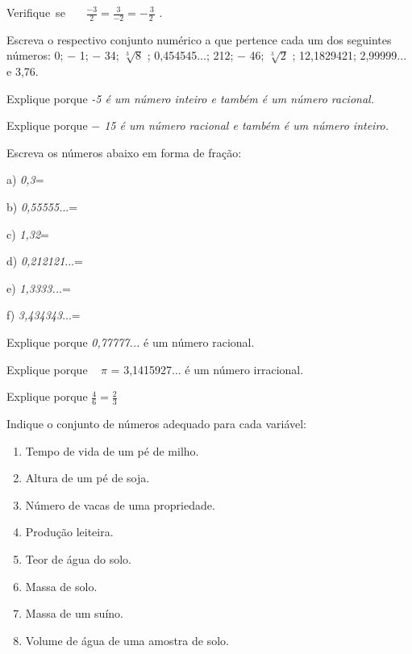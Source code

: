 \begin{exercicios}
\exitem{} Verifique~se~~~   \( \frac{-3}{2}=\frac{3}{-2}=-\frac{3}{2~} \) .

\exitem{} Escreva o respectivo conjunto numérico a que pertence cada um dos seguintes números:  0; $-$ 1; $-$ 34;  \( \sqrt[3]{8} \) ; 0,454545...; 212; $-$ 46;  \( \sqrt[3]{2} \) ; 12,1829421; 2,99999... e 3,76.

\exitem{} Explique porque \textit{-5 é um número inteiro e também é um número racional.}

\exitem{} Explique porque \textit{$-$ 15 é um número racional e também é um número inteiro.}

\exitem{} Escreva os números abaixo em forma de fração:
\begin{multicols}{3}
	
a) \textit{0,3}=

b) \textit{0,55555.}..=

c) \textit{1,32}= 

d) \textit{0,212121}...=

e) \textit{1,3333..}.=

f) \textit{3,434343}...=
\end{multicols}

	\exitem{}  Explique porque \textit{0,77777...} é um número racional.

	\exitem{}  Explique porque ~ $ \pi $  = 3,1415927... é um número irracional.

	\exitem{}  Explique porque  \( \frac{4}{6}=\frac{2}{3} \)  ~~ 

	\exitem{}  Indique o conjunto de números adequado para cada variável:
	\begin{enumerate}[label=\alph*)]
    \item Tempo de vida de um pé de milho.

    \item Altura de um pé de soja.

    \item Número de vacas de uma propriedade.

    \item Produção leiteira.

    \item Teor de água do solo.

    \item Massa de solo.

    \item Massa de um suíno.

    \item Volume de água de uma amostra de solo.


\end{enumerate}
\end{exercicios}
